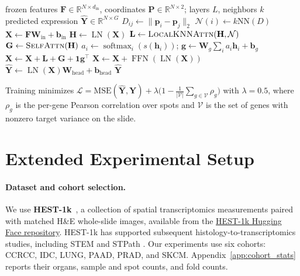 \documentclass[11pt]{article}
\newcommand{\morph}{\textbf{MIST}}
\begin{document}
\begin{algorithm}[H]
\caption{\morph{} forward pass (one slide)}
\label{alg:mist}
\begin{algorithmic}[1]
\Require frozen features $\mathbf{F}\in\mathbb{R}^{N\times d_{\mathrm{in}}}$, coordinates
  $\mathbf{P}\in\mathbb{R}^{N\times2}$; layers $L$, neighbors $k$
\Ensure predicted expression $\widehat{\mathbf{Y}}\in\mathbb{R}^{N\times G}$
\State $D_{ij}\gets \lVert \mathbf{p}_i-\mathbf{p}_j\rVert_2$ 
\State $\mathcal{N}(i) \gets k\text{NN}(D)$ 
\State $\mathbf{X}\gets \mathbf{F}\mathbf{W}_{\mathrm{in}}+\mathbf{b}_{\mathrm{in}}$ 
  \State $\mathbf{H}\gets \operatorname{LN}(\mathbf{X})$
  \State $\mathbf{L}\gets \textsc{LocalKNNAttn}(\mathbf{H},\mathcal{N})$ 
  \State $\mathbf{G}\gets \textsc{SelfAttn}(\mathbf{H})$ 
  \State $a_i\gets \operatorname{softmax}_i(s(\mathbf{h}_i))$;\quad
         $\mathbf{g}\gets \mathbf{W}_g\!\sum_i a_i\mathbf{h}_i+\mathbf{b}_g$ 
  \State $\mathbf{X}\gets \mathbf{X}+\mathbf{L}+\mathbf{G}+\mathbf{1}\mathbf{g}^\top$ 
  \State $\mathbf{X}\gets \mathbf{X}+\operatorname{FFN}(\operatorname{LN}(\mathbf{X}))$
\EndFor
\State $\widehat{\mathbf{Y}}\gets \operatorname{LN}(\mathbf{X})\mathbf{W}_{\mathrm{head}}+\mathbf{b}_{\mathrm{head}}$
\State \Return $\widehat{\mathbf{Y}}$
\end{algorithmic}
\end{algorithm}

\noindent Training minimizes
$\mathcal{L}=\mathrm{MSE}(\widehat{\mathbf{Y}},\mathbf{Y})+\lambda\big(1-\tfrac{1}{|\mathcal{V}|}\sum_{g\in\mathcal{V}}\rho_g\big)$
with $\lambda{=}0.5$, where $\rho_g$ is the per-gene Pearson correlation over spots and $\mathcal{V}$
is the set of genes with nonzero target variance on the slide.

\section{Extended Experimental Setup}
\label{app:extended_setup}

\paragraph{Dataset and cohort selection.}
We use \textbf{HEST-1k}~\cite{jaume2024hest}, a collection of spatial transcriptomics
measurements paired with matched H\&E whole-slide images, available from the
\href{https://huggingface.co/datasets/MahmoodLab/hest}{HEST-1k Hugging Face repository}. HEST-1k has
supported subsequent histology-to-transcriptomics studies, including STEM and STPath
\cite{zhu2025diffusion,stpath2025}. Our experiments use six cohorts: CCRCC, IDC, LUNG, PAAD, PRAD,
and SKCM. Appendix~\ref{app:cohort_stats} reports their organs, sample and spot counts, and fold
counts.
\end{document}
